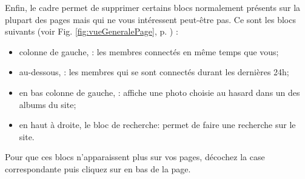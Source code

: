 \label{sec:supprimerBlocs}

Enfin, le cadre  permet de supprimer certains blocs normalement présents sur la plupart des pages mais qui ne vous intéressent peut-être pas. Ce sont les blocs suivants (voir Fig. \ref{fig:vueGeneralePage}, p. \pageref{fig:vueGeneralePage}) :
\begin{itemize}
    \item colonne de gauche, : les membres connectés en même temps que vous;
    \item au-dessous,  : les membres qui se sont connectés durant les dernières 24h;
    \item en bas colonne de gauche, : affiche une photo choisie au hasard dans un des albums du site;
    \item en haut à droite, le bloc de recherche: permet de faire une recherche sur le site.
\end{itemize}

Pour que ces blocs n’apparaissent plus sur vos pages,  décochez la case correspondante puis cliquez sur  en bas de la page.

